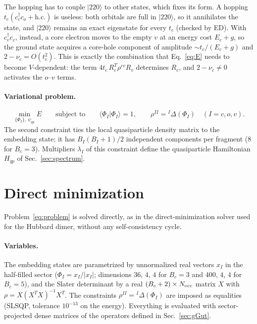 \documentclass[11pt]{article}
\newcommand{\dg}{^{\dagger}}
\newcommand{\ket}[1]{|#1\rangle}
\newcommand{\braket}[1]{\langle #1\rangle}
\begin{document}
The hopping has to couple $\ket{220}$ to other states, which fixes its form. A hopping $t_c(c\dg_{c}c_{o}+\mathrm{h.c.})$ is useless: both
orbitals are full in $\ket{220}$, so it annihilates the state, and $\ket{220}$ remains an exact eigenstate for every $t_c$ (checked by ED). With
$c\dg_vc_c$, instead, a core electron moves to the empty $v$ at an energy cost $E_c+g$, so the ground state acquires a core-hole component of amplitude
$\sim t_c/(E_c+g)$ and $2-\nu_c=O(t_c^2)$. This is exactly the combination that Eq.~\eqref{eq:E} needs to become $V$-dependent: the term
$4t_c\,R_c^T\rho^{cv}R_v$ determines $R_c$, and $2-\nu_c\neq0$ activates the $o$--$v$ terms.

\paragraph{Variational problem.}
\begin{equation}
\min_{\{\Phi_I\},\ \psi_{qp}}E\qquad\text{subject to}\qquad
\braket{\Phi_I|\Phi_I}=1,\qquad \rho^{II}={}^I\Delta(\Phi_I)\quad(I=c,o,v).
\label{eq:problem}
\end{equation}
The second constraint ties the local quasiparticle density matrix to the embedding state; it has $B_I(B_I+1)/2$
independent components per fragment ($8$ for $B_c=3$). Multipliers $\lambda_I$ of this constraint define the
quasiparticle Hamiltonian $H_{qp}$ of Sec.~\ref{sec:spectrum}.

\section{Direct minimization}
\label{sec:direct}

Problem~\eqref{eq:problem} is solved directly, as in the direct-minimization solver
used for the Hubbard dimer, without any self-consistency cycle.

\paragraph{Variables.} The embedding states are parametrized by unnormalized real vectors $x_I$ in the half-filled sector
($\Phi_I=x_I/|x_I|$; dimensions $36$, $4$, $4$ for $B_c=3$ and $400$, $4$, $4$ for $B_c=5$), and the Slater determinant by a
real $(B_c+2)\times N_{\rm occ}$ matrix $X$ with $\rho=X(X^TX)^{-1}X^T$. The constraints $\rho^{II}={}^I\Delta(\Phi_I)$ are imposed as
equalities (SLSQP, tolerance $10^{-13}$ on the energy). Everything is evaluated with sector-projected dense matrices of the
operators defined in Sec.~\ref{sec:gGut}.
\end{document}
